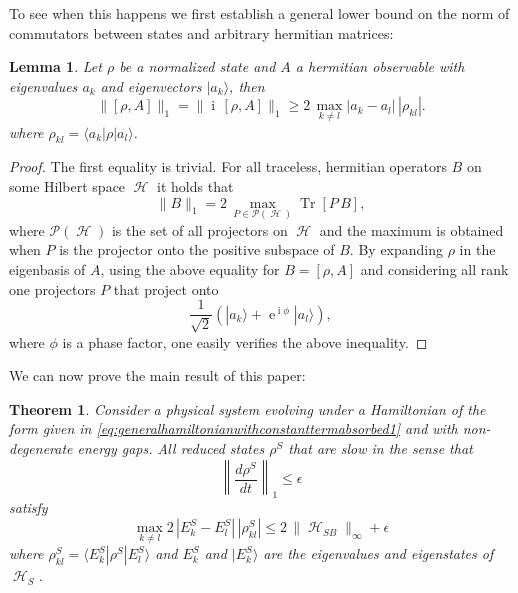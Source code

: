 \documentclass[aps,prl,twocolumn,showpacs,showkeys,a4paper]{revtex4}
\newtheorem{lemma}{Lemma}
\newtheorem{theorem}{Theorem}
\DeclareMathOperator{\Tr}{\mathrm{Tr}}%
\DeclareMathOperator{\ee}{\mathrm{e}}%
\DeclareMathOperator{\iu}{\mathrm{i}}%
\DeclareMathOperator{\hiH}{\mathcal{H}}%
\DeclareMathOperator{\haH}{\mathscr{H}}%
\newcommand{\bra}[1]{\langle #1|}
\newcommand{\ket}[1]{|#1\rangle}
\begin{document}
To see when this happens we first establish a general lower bound on the norm of commutators between states and arbitrary hermitian matrices:
\begin{lemma}
  \label{lemma:lowerboundonnormsofcommuators}
  Let $\rho$ be a normalized state and $A$ a hermitian observable with eigenvalues $a_k$ and eigenvectors $\ket{a_k}$, then
  \begin{equation}
    \| [\rho,A] \|_1 = \| \iu\,[\rho,A] \|_1 \geq 2\,\max_{k \neq l} |a_k - a_l|\,|\rho_{kl}|.
  \end{equation}
  where $\rho_{kl} = \bra{a_k}\rho\ket{a_l}$.
\end{lemma}
\begin{proof}
  The first equality is trivial.
  For all traceless, hermitian operators $B$ on some Hilbert space $\hiH$ it holds that \cite{nielsenm.a.c}
  \begin{equation}
    \|B\|_1 = 2\,\max_{P \in \mathcal{P}(\hiH)} \Tr[P\,B] ,
  \end{equation}
  where $\mathcal{P}(\hiH)$ is the set of all projectors on $\hiH$ and the maximum is obtained when $P$ is the projector onto the positive subspace of $B$.
  By expanding $\rho$ in the eigenbasis of $A$, using the above equality for $B=[\rho,A]$ and considering all rank one projectors $P$ that project onto
  \begin{equation}
    \frac{1}{\sqrt{2}}(\ket{a_k} + \ee^{\iu \phi} \ket{a_l}) ,
  \end{equation}
  where $\phi$ is a phase factor, one easily verifies the above inequality.
\end{proof}
We can now prove the main result of this paper:
\begin{theorem}
  \label{theorem:slowstatesmustdecohere}
  Consider a physical system evolving under a Hamiltonian of the form given in \eqref{eq:generalhamiltonianwithconstanttermabsorbed1} and with non-degenerate energy gaps.
  All reduced states $\rho^S$ that are slow in the sense that 
  \begin{equation}
    \left\|\frac{d\rho^S}{dt}\right\|_1 \leq \epsilon
  \end{equation}
  satisfy
  \begin{equation}
    \max_{k \neq l} 2\,|E^S_k - E^S_l|\,|\rho^S_{kl}| \leq 2\,\|\haH_{SB}\|_{\infty} + \epsilon
  \end{equation}
  where $\rho^S_{kl} = \bra{E^S_k} \rho^S \ket{E^S_l}$ and $E^S_k$ and $\ket{E^S_k}$ are the eigenvalues and eigenstates of $\haH_S$.
\end{theorem}
\end{document}
